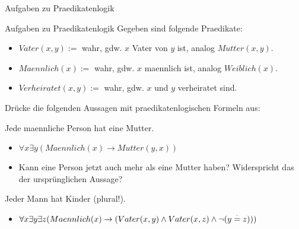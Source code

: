 \documentclass[]{beamer}
\begin{document}
\begin{frame}{Aufgaben zu Praedikatenlogik}
	\begin{taskblock}{Aufgaben zu Praedikatenlogik}
		Gegeben sind folgende Praedikate:
		\begin{itemize}
			\item $Vater(x,y) := $ wahr, gdw. $x$ Vater von $y$ ist, analog $Mutter(x,y)$.
			\item $Maennlich(x) := $ wahr, gdw. $x$ maennlich ist, analog $Weiblich(x)$.
			\item $Verheiratet(x,y) := $ wahr, gdw. $x$ und $y$ verheiratet sind.
		\end{itemize}
	
	
		Drücke die folgenden Aussagen mit praedikatenlogischen Formeln aus:
		
		\begin{itemize}
			\pitem Jede maennliche Person hat eine Mutter.
			\begin{itemize}
				\pause\item $\forall x \exists y (Maennlich(x) \rightarrow Mutter(y,x))$
				\pause\item Kann eine Person jetzt auch mehr als eine Mutter haben? \pause Widerspricht das der ursprünglichen Aussage?
			\end{itemize}
			\pitem Jeder Mann hat Kinder (plural!).
			\begin{itemize}
				\pause\item $\forall x \exists y \exists z (Maennlich(x) \rightarrow ( Vater(x,y) \land Vater(x,z) \land \lnot (y \stackrel{\cdot}{=} z)))$
			\end{itemize}
		\end{itemize}
	\end{taskblock}
\end{frame}
\end{document}
